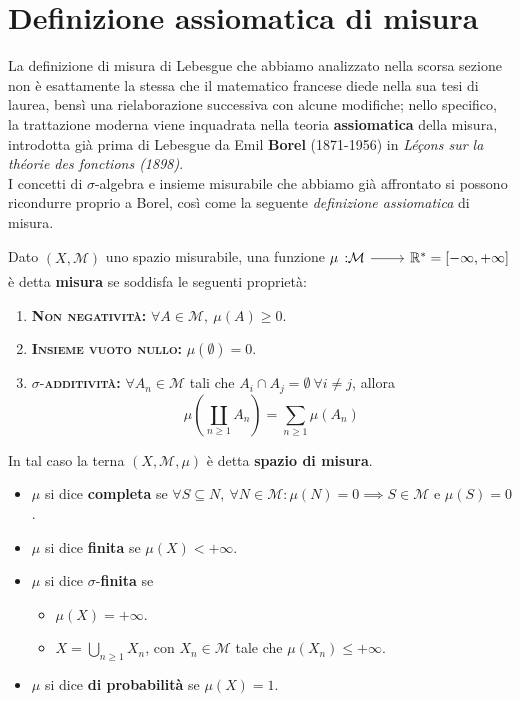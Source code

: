 \section{Definizione assiomatica di misura}
La definizione di misura di Lebesgue che abbiamo analizzato nella scorsa sezione non è esattamente la stessa che il matematico francese diede nella sua tesi di laurea, bensì una rielaborazione successiva con alcune modifiche; nello specifico, la trattazione moderna viene inquadrata nella teoria \textbf{assiomatica} della misura, introdotta già prima di Lebesgue da Emil \textbf{Borel} (1871-1956) in \textit{Léçons sur la théorie des fonctions (1898)}.\\
I concetti di $\sigma$-algebra e insieme misurabile che abbiamo già affrontato si possono ricondurre proprio a Borel, così come la seguente \textit{definizione assiomatica} di misura.
\begin{define}
	Dato $\left(X,\mathcal{M}\right)$ uno spazio misurabile, una funzione $\funz{\mu}{\mathcal{M}}{\realset^{\ast}=\left[-\infty,+\infty\right]}$ è detta \textbf{misura} se soddisfa le seguenti proprietà:
	\begin{enumerate}
		\item \textsc{\textbf{Non negatività:}} $\forall A\in\mathcal{M},\ \mu\left(A\right)\geq 0$.
		\item \textsc{\textbf{Insieme vuoto nullo:}} $\mu\left(\emptyset\right)=0$.
		\item $\sigma$-\textsc{\textbf{additività:}} $\forall A_n\in\mathcal{M}$ tali che $A_i\cap A_j=\emptyset\ \forall i\neq j$, allora
		\begin{equation}
			\mu\left(\coprod_{n\geq 1}A_n\right)=\sum_{n\geq 1}\mu\left(A_n\right)
		\end{equation}
	\end{enumerate}
	In tal caso la terna $\left(X,\mathcal{M},\mu\right)$ è detta \textbf{spazio di misura}.
	\begin{itemize}
		\item $\mu$ si dice \textbf{completa} se $\forall S\subseteq N,\ \forall N\in\mathcal{M}\colon\mu(N)=0\implies S\in\mathcal{M}$ e $\mu(S)=0$.
		\item $\mu$ si dice \textbf{finita} se $\mu(X)<+\infty$.
		\item $\mu$ si dice $\sigma$-\textbf{finita} se
		\begin{itemize}
			\item $\mu(X)=+\infty$.
			\item $\displaystyle X=\bigcup_{n\geq 1}X_n$, con $X_n\in\mathcal{M}$ tale che $\mu\left(X_n\right)\leq +\infty$.
		\end{itemize}
	\item $\mu$ si dice \textbf{di probabilità} se $\mu(X)=1$.
	\end{itemize}
\end{define}
